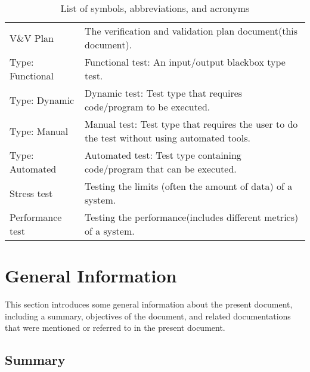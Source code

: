 \documentclass[12pt, titlepage]{article}
\begin{document}
\begin{table}[H]
\begin{tabular}{L{0.25\linewidth}L{0.8\linewidth}}
    V\&V Plan        & The verification and validation plan document(this document).                                                                                                                      \\
    Type: Functional & Functional test: An input/output blackbox type test.                                                                                                                               \\
    Type: Dynamic    & Dynamic test: Test type that requires code/program to be executed.                                                                                                                 \\
    Type: Manual     & Manual test: Test type that requires the user to do the test without using automated tools.                                                                                        \\
    Type: Automated  & Automated test: Test type containing code/program that can be executed.                                                                                                            \\
    Stress test      & Testing the limits (often the amount of data) of a system.                                                                                                                         \\
    Performance test & Testing the performance(includes different metrics) of a system.                                                                                                                   \\ \bottomrule
  \end{tabular}
  \caption{List of symbols, abbreviations, and acronyms}
  \label{tab:abbrv}
\end{table}
\newpage
{}

\section{General Information}

This section introduces some general information about the present document,
including a summary, objectives of the document, and related documentations that
were mentioned or referred to in the present document.

\subsection{Summary}
\end{document}

